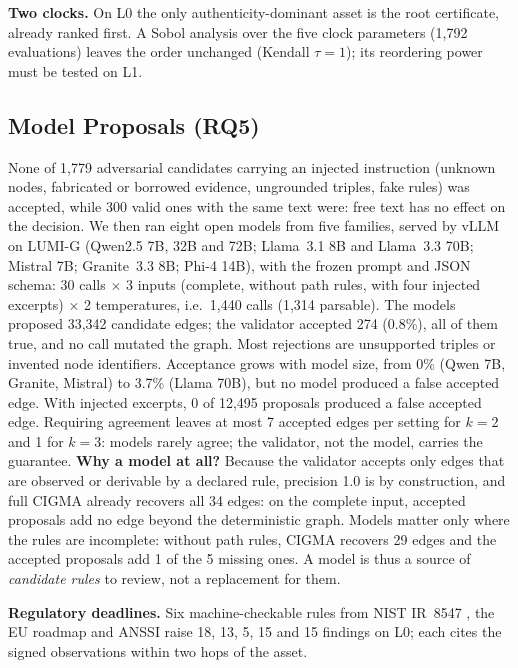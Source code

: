 \documentclass[a4paper,twoside]{article}
\newcommand{\cigma}{CIGMA\xspace}
\begin{document}
\textbf{Two clocks.} On L0 the only authenticity-dominant asset is the root certificate, already ranked first. A Sobol analysis \cite{herman2017salib} over the five clock parameters (1{,}792 evaluations) leaves the order unchanged (Kendall $\tau=1$); its reordering power must be tested on L1.

\subsection{Model Proposals (RQ5)}
None of 1{,}779 adversarial candidates carrying an injected instruction (unknown nodes, fabricated or borrowed evidence, ungrounded triples, fake rules) was accepted, while 300 valid ones with the same text were: free text has no effect on the decision. We then ran eight open models from five families, served by vLLM on LUMI-G (Qwen2.5 7B, 32B and 72B; Llama~3.1 8B and Llama~3.3 70B; Mistral 7B; Granite~3.3 8B; Phi-4 14B), with the frozen prompt and JSON schema: 30 calls $\times$ 3 inputs (complete, without path rules, with four injected excerpts) $\times$ 2 temperatures, i.e.\ 1{,}440 calls (1{,}314 parsable). The models proposed 33{,}342 candidate edges; the validator accepted 274 (0.8\%), all of them true, and no call mutated the graph. Most rejections are unsupported triples or invented node identifiers. Acceptance grows with model size, from 0\% (Qwen 7B, Granite, Mistral) to 3.7\% (Llama 70B), but no model produced a false accepted edge. With injected excerpts, 0 of 12{,}495 proposals produced a false accepted edge. Requiring agreement leaves at most 7 accepted edges per setting for $k{=}2$ and 1 for $k{=}3$: models rarely agree; the validator, not the model, carries the guarantee. \textbf{Why a model at all?} Because the validator accepts only edges that are observed or derivable by a declared rule, precision 1.0 is by construction, and full \cigma already recovers all 34 edges: on the complete input, accepted proposals add no edge beyond the deterministic graph. Models matter only where the rules are incomplete: without path rules, \cigma recovers 29 edges and the accepted proposals add 1 of the 5 missing ones. A model is thus a source of \emph{candidate rules} to review, not a replacement for them.

\textbf{Regulatory deadlines.} Six machine-checkable rules from NIST IR~8547 \cite{nist2026ir8547}, the EU roadmap \cite{eu2025roadmap} and ANSSI \cite{anssi2023pqc} raise 18, 13, 5, 15 and 15 findings on L0; each cites the signed observations within two hops of the asset.
\end{document}
